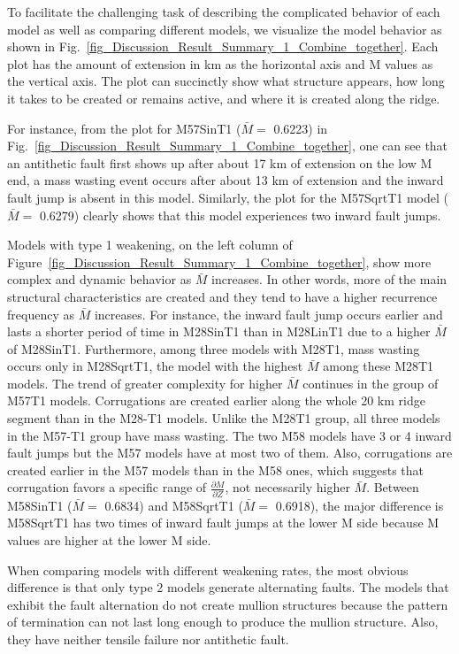 \documentclass[draft,gc]{agutex}
\begin{document}
\begin{article}
To facilitate the challenging task of describing the complicated behavior of each model as well as comparing different models, we visualize the model behavior as shown in Fig.~\ref{fig_Discussion_Result_Summary_1_Combine_together}. Each plot has the amount of extension in km as the horizontal axis and M values as the vertical axis. The plot can succinctly show what structure appears, how long it takes to be created or remains active, and where it is created along the ridge.

For instance, from the plot for M57SinT1 ($\bar{M} =$ 0.6223) in Fig.~\ref{fig_Discussion_Result_Summary_1_Combine_together}, one can see that an antithetic fault first shows up after about 17 km of extension on the low M end, a mass wasting event occurs after about 13 km of extension and the inward fault jump is absent in this model. Similarly, the plot for the M57SqrtT1 model ($\bar{M} =$ 0.6279) clearly shows that this model experiences two inward fault jumps.

Models with type 1 weakening, on the left column of Figure~\ref{fig_Discussion_Result_Summary_1_Combine_together}, show more complex and dynamic behavior as $\bar{M}$ increases. In other words, more of the main structural characteristics are created and they tend to have a higher recurrence frequency as $\bar{M}$ increases. For instance, the inward fault jump occurs earlier and lasts a shorter period of time in M28SinT1 than in M28LinT1 due to a higher $\bar{M}$ of M28SinT1. Furthermore, among three models with M28T1, mass wasting occurs only in M28SqrtT1, the model with the highest $\bar{M}$ among these M28T1 models. The trend of greater complexity for higher $\bar{M}$ continues in the group of M57T1 models. Corrugations are created earlier along the whole 20 km ridge segment than in the M28-T1 models. Unlike the M28T1 group, all three models in the M57-T1 group have mass wasting. The two M58 models have 3 or 4 inward fault jumps but the M57 models have at most two of them. Also, corrugations are created earlier in the M57 models than in the M58 ones, which suggests that corrugation favors a specific range of $\frac{\partial M}{\partial Z}$, not necessarily higher $\bar{M}$. Between M58SinT1 ($\bar{M} =$ 0.6834) and M58SqrtT1 ($\bar{M} =$ 0.6918), the major difference is M58SqrtT1 has two times of inward fault jumps at the lower M side because M values are higher at the lower M side.

When comparing models with different weakening rates, the most obvious difference is that only type 2 models generate alternating faults. The models that exhibit the fault alternation do not create mullion structures because the pattern of termination can not last long enough to produce the mullion structure. Also, they have neither tensile failure nor antithetic fault.


\end{article}
\end{document}
